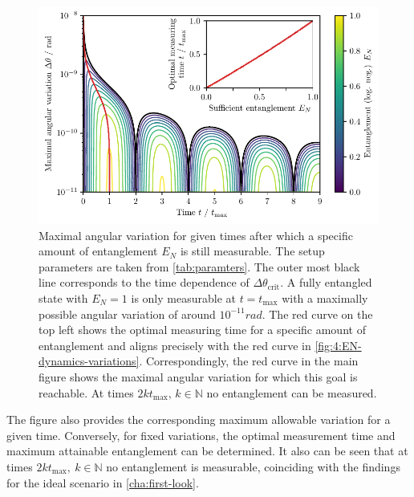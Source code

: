 \begin{figure}[!htbp]
  \centering
  \includegraphics[width=\textwidth]{./../figures/theta-variance/time-delta-theta-crit-EN.pdf}
  \caption{Maximal angular variation for given times after which a specific amount of entanglement $E_N$ is still measurable. The setup parameters are taken from \cref{tab:paramters}. The outer most black line corresponds to the time dependence of $\Delta \theta_\mathrm{crit}$. A fully entangled state with $E_N=1$ is only measurable at $t=t_\mathrm{max}$ with a maximally possible angular variation of around $10^{-11}\si{rad}$. The red curve on the top left shows the optimal measuring time for a specific amount of entanglement and aligns precisely with the red curve in \cref{fig:4:EN-dynamics-variations}. Correspondingly, the red curve in the main figure shows the maximal angular variation for which this goal is reachable. At times $2k t_\mathrm{max},\,k\in\mathbb{N}$ no entanglement can be measured.}
  \label{fig:4:time-delta-theta}
\end{figure}
The figure also provides the corresponding maximum allowable variation for a given time. Conversely, for fixed variations, the optimal measurement time and maximum attainable entanglement can be determined.
It also can be seen that at times $2k t_\mathrm{max}, \ k\in\mathbb{N}$ no entanglement is measurable, coinciding with the findings for the ideal scenario in \cref{cha:first-look}. 
